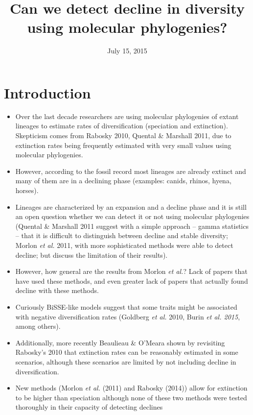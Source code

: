 \documentclass[12pt,]{article}
\title{Can we detect decline in diversity using molecular phylogenies?}
\author{}
\date{July 15, 2015}
\begin{document}
\maketitle


\section{Introduction}\label{introduction}

\begin{itemize}
\item
  Over the last decade researchers are using molecular phylogenies of
  extant lineages to estimate rates of diversification (speciation and
  extinction). Skepticism comes from Rabosky 2010, Quental \& Marshall
  2011, due to extinction rates being frequently estimated with very
  small values using molecular phylogenies.
\item
  However, according to the fossil record most lineages are already
  extinct and many of them are in a declining phase (examples: canids,
  rhinos, hyena, horses).
\item
  Lineages are characterized by an expansion and a decline phase and it
  is still an open question whether we can detect it or not using
  molecular phylogenies (Quental \& Marshall 2011 suggest with a simple
  approach -- gamma statistics -- that it is difficult to distinguish
  between decline and stable diversity; Morlon \emph{et al.} 2011, with
  more sophisticated methods were able to detect decline; but discuss
  the limitation of their results).
\item
  However, how general are the results from Morlon \emph{et al.}? Lack
  of papers that have used these methods, and even greater lack of
  papers that actually found decline with these methods.
\item
  Curiously BiSSE-like models suggest that some traits might be
  associated with negative diversification rates (Goldberg \emph{et al.}
  2010, Burin \emph{et al. 2015}, among others).
\item
  Additionally, more recently Beaulieau \& O'Meara shown by revisiting
  Rabosky's 2010 that extinction rates can be reasonably estimated in
  some scenarios, although these scenarios are limited by not including
  decline in diversification.
\item
  New methods (Morlon \emph{et al.} (2011) and Rabosky (2014)) allow for
  extinction to be higher than speciation although none of these two
  methods were tested thoroughly in their capacity of detecting declines

\end{itemize}
\end{document}
